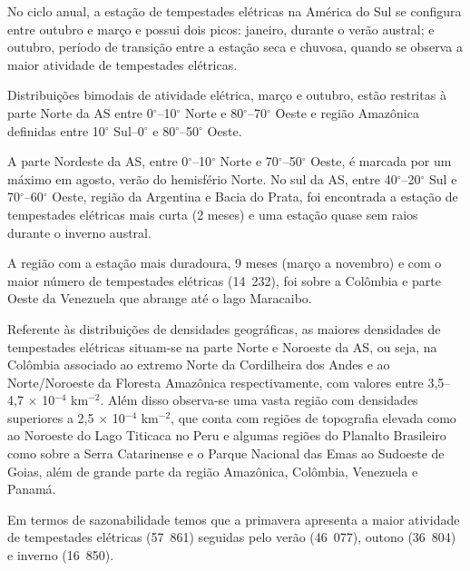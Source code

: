 
No ciclo anual, a estação de tempestades elétricas na América do Sul se configura entre outubro e março e possui dois picos: janeiro, durante o verão austral; e outubro, período de transição entre a estação seca e chuvosa, quando se observa a maior atividade de tempestades elétricas. 

Distribuições bimodais de atividade elétrica, março e outubro, estão restritas à parte Norte da AS entre 0$^{\circ}$--10$^{\circ}$ Norte e 80$^{\circ}$--70$^{\circ}$ Oeste e região Amazônica definidas entre 10$^{\circ}$ Sul--0$^{\circ}$ e 80$^{\circ}$--50$^{\circ}$ Oeste. 

A parte Nordeste da AS, entre 0$^{\circ}$--10$^{\circ}$ Norte e 70$^{\circ}$--50$^{\circ}$ Oeste, é marcada por um máximo em agosto, verão do hemisfério Norte. No sul da AS,  entre 40$^{\circ}$--20$^{\circ}$ Sul e 70$^{\circ}$--60$^{\circ}$ Oeste, região da Argentina e Bacia do Prata, foi encontrada a estação de tempestades elétricas mais curta (2 meses) e uma estação quase sem raios durante o inverno austral.

A região com a estação mais duradoura, 9 meses (março a novembro) e com o maior número de tempestades elétricas (14~232), foi sobre a Colômbia e parte Oeste da Venezuela que abrange até o lago Maracaibo.  



Referente às distribuições de densidades geográficas, as maiores densidades de tempestades elétricas situam-se na parte Norte e Noroeste da AS, ou seja, na Colômbia associado ao extremo Norte da Cordilheira dos Andes e ao Norte/Noroeste da Floresta Amazônica respectivamente, com valores entre 3,5--4,7 $\times$ 10$^{-4}$ km$^{-2}$. Além disso observa-se uma vasta região com densidades superiores a  2,5 $\times$ 10$^{-4}$ km$^{-2}$, que conta com regiões de topografia elevada como ao Noroeste do Lago Titicaca no Peru e algumas regiões do Planalto Brasileiro como sobre a Serra Catarinense e o Parque Nacional das Emas ao Sudoeste de Goias, além de grande parte da região Amazônica, Colômbia, Venezuela e Panamá.  

Em termos de sazonabilidade temos que a primavera apresenta a maior atividade de tempestades elétricas (57~861) seguidas pelo verão (46~077), outono (36~804) e inverno (16~850). 

